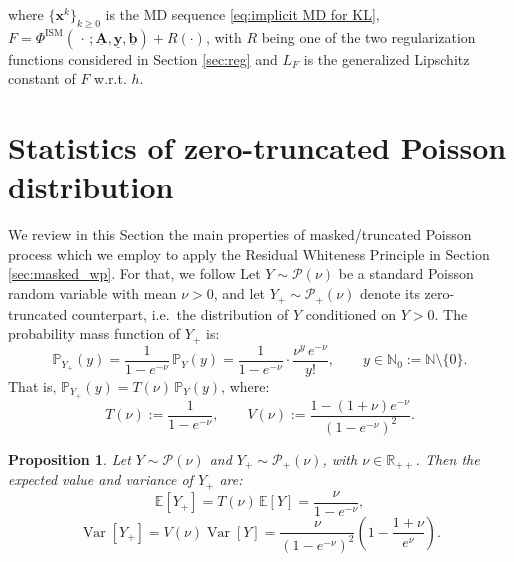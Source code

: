 \documentclass[letterpaper]{article}
\newtheorem{proposition}{Proposition}
\begin{document}
where $\{ \mathbf{x}^k \}_{k \geq 0}$ is the MD sequence \eqref{eq:implicit MD for KL}, $F = \Phi^{\text{ISM}}(\,\cdot\,; \underline{\mathbf{A}}, \underline{\mathbf{y}}, 
\underline{\mathbf{b}}) + R(\cdot)$, with $R$ being one of the two regularization functions considered in Section \ref{sec:reg} and  $L_F$ is the generalized Lipschitz constant of $F$ w.r.t. $h$.



\section{Statistics of zero-truncated Poisson distribution}\label{masked_wh_proof}


We review in this Section the main properties of masked/truncated Poisson process which we employ to apply the Residual Whiteness Principle in Section \ref{sec:masked_wp}.
For that, we follow \cite[Proposition 4.2]{Bevilacqua_2023}
Let $Y \sim \mathcal{P}(\nu)$ be a standard Poisson random variable with mean $\nu > 0$, 
and let $Y_+ \sim \mathcal{P}_+(\nu)$ denote its zero-truncated counterpart, i.e.\ the 
distribution of $Y$ conditioned on $Y > 0$. The probability mass function of $Y_+$ is:
\begin{equation}
    \mathbb{P}_{Y_+}(y) = \frac{1}{1 - e^{-\nu}}\,\mathbb{P}_Y(y) 
    = \frac{1}{1 - e^{-\nu}} \cdot \frac{\nu^y\, e^{-\nu}}{y!}, 
    \qquad y \in \mathbb{N}_0 := \mathbb{N} \setminus \{0\}.
\end{equation}
That is, $\mathbb{P}_{Y_+}(y) = T(\nu)\,\mathbb{P}_Y(y)$, where:
\begin{equation}
    T(\nu) := \frac{1}{1 - e^{-\nu}}, \qquad V(\nu) := \frac{1-(1+\nu)e^{-\nu}}{(1-e^{-\nu})^2}.
\end{equation}

\begin{proposition}
Let $Y \sim \mathcal{P}(\nu)$ and $Y_+ \sim \mathcal{P}_+(\nu)$, with $\nu \in \mathbb{R}_{++}$. 
Then the expected value and variance of $Y_+$ are:
\begin{equation}
    \mathbb{E}[Y_+] = T(\nu)\,\mathbb{E}[Y] = \frac{\nu}{1 - e^{-\nu}}, 
    \label{eq:zt_mean}
\end{equation}
\begin{equation}
    \operatorname{Var}[Y_+] = V(\nu)\operatorname{Var}[Y] 
    = \frac{\nu}{(1-e^{-\nu})^2}\!\left(1 - \frac{1+\nu}{e^\nu}\right).
    \label{eq:zt_var}
\end{equation}
\end{proposition}
\end{document}
